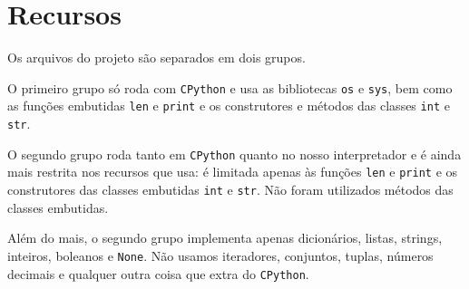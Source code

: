 \section{Recursos}

Os arquivos do projeto são separados em dois grupos.

O primeiro grupo só roda com \texttt{CPython} e usa
as bibliotecas \verb|os| e \verb|sys|, bem como as
funções embutidas \verb|len| e \verb|print| e os
construtores e métodos das classes \verb|int| e \verb|str|.

O segundo grupo roda tanto em \texttt{CPython} quanto
no nosso interpretador e é ainda mais restrita nos recursos
que usa: é limitada apenas às funções
\verb|len| e \verb|print| e os
construtores das classes embutidas \verb|int| e \verb|str|.
Não foram utilizados métodos das classes embutidas.

  
Além do mais, o segundo grupo implementa apenas dicionários,
listas, strings, inteiros, boleanos e \verb|None|. Não usamos
iteradores, conjuntos, tuplas, números decimais
e qualquer outra coisa que extra do \texttt{CPython}.